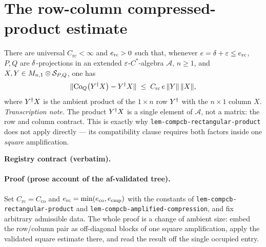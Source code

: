 \section{The row-column compressed-product estimate}\label{sec:compcb-row-column-product}

\begin{lemma}\label{lem:compcb-row-column-product}
There are universal $C_{\mathrm{rc}}<\infty$ and $e_{\mathrm{rc}}>0$ such that,
whenever $e=\delta+\varepsilon\le e_{\mathrm{rc}}$, $P,Q$ are $\delta$-projections in an
extended $\varepsilon$-$C^*$-algebra $\mathcal A$, $n\ge1$, and
$X,Y\in M_{n,1}\otimes\mathcal S_{P,Q}$, one has
\begin{equation}\label{eq:rc-main}
  \lVert \mathrm{Co}_{Q}\bigl(Y^{\dagger} X\bigr)-Y^{\dagger} X\rVert\;\le\;C_{\mathrm{rc}}\,e\,\lVert Y\rVert\,\lVert X\rVert,
\end{equation}
where $Y^{\dagger} X$ is the ambient product of the $1\times n$ row $Y^{\dagger}$ with the $n\times1$
column $X$.
\emph{Transcription note.} The product $Y^{\dagger} X$ is a single element of $\mathcal A$, not a
matrix: the row and column contract. This is exactly why
\texttt{lem-compcb-rectangular-product} does not apply directly --- its compatibility
clause requires both factors inside one \emph{square} amplification.
\end{lemma}

\noindent\textbf{Registry contract (verbatim).}

\paragraph{Proof (prose account of the af-validated tree).}
Set $C_{\mathrm{rc}}=C_{\mathrm{co}}$ and
$e_{\mathrm{rc}}=\min(e_{\mathrm{co}},e_{\mathrm{cmp}})$ with the constants of
\texttt{lem-compcb-rectangular-product} and \texttt{lem-compcb-amplified-compression},
and fix arbitrary admissible data. The whole proof is a change of ambient size: embed the
row/column pair as off-diagonal blocks of one square amplification, apply the validated
square estimate there, and read the result off the single occupied entry.

